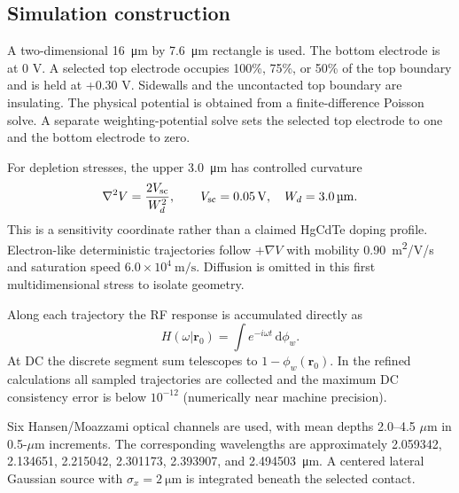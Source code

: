 \documentclass[11pt]{article}
\newcommand{\dd}{\mathrm{d}}
\begin{document}
\subsection{Simulation construction}
A two-dimensional \SI{16}{\micro\meter} by \SI{7.6}{\micro\meter} rectangle is used. The bottom electrode is at 0 V. A selected top electrode occupies 100\%, 75\%, or 50\% of the top boundary and is held at +0.30 V. Sidewalls and the uncontacted top boundary are insulating. The physical potential is obtained from a finite-difference Poisson solve. A separate weighting-potential solve sets the selected top electrode to one and the bottom electrode to zero.

For depletion stresses, the upper \SI{3.0}{\micro\meter} has controlled curvature
\begin{equation}
\nabla^2V=\frac{2V_{\rm sc}}{W_d^2},\qquad V_{\rm sc}=\SI{0.05}{V},\quad W_d=\SI{3.0}{\micro\meter}.
\end{equation}
This is a sensitivity coordinate rather than a claimed HgCdTe doping profile. Electron-like deterministic trajectories follow $+\nabla V$ with mobility \SI{0.90}{m^2/V/s} and saturation speed $6.0\times10^4\ \mathrm{m/s}$. Diffusion is omitted in this first multidimensional stress to isolate geometry.

Along each trajectory the RF response is accumulated directly as
\begin{equation}
\boxed{H(\omega|\mathbf r_0)=\int e^{-i\omega t}\,\dd\phi_w.}
\end{equation}
At DC the discrete segment sum telescopes to $1-\phi_w(\mathbf r_0)$. In the refined calculations all sampled trajectories are collected and the maximum DC consistency error is below $10^{-12}$ (numerically near machine precision).

Six Hansen/Moazzami optical channels are used, with mean depths 2.0--4.5 $\mu$m in 0.5-$\mu$m increments. The corresponding wavelengths are approximately 2.059342, 2.134651, 2.215042, 2.301173, 2.393907, and \SI{2.494503}{\micro\meter}. A centered lateral Gaussian source with $\sigma_x=\SI{2}{\micro\meter}$ is integrated beneath the selected contact.
\end{document}
